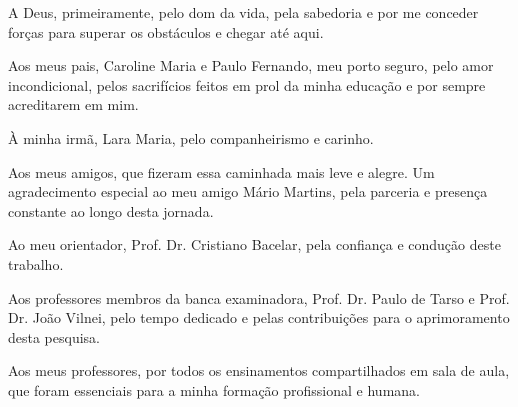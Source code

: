 A Deus, primeiramente, pelo dom da vida, pela sabedoria e por me conceder forças
para superar os obstáculos e chegar até aqui.

Aos meus pais, Caroline Maria e Paulo Fernando, meu porto seguro, pelo amor
incondicional, pelos sacrifícios feitos em prol da minha educação e por sempre
acreditarem em mim. 

À minha irmã, Lara Maria, pelo companheirismo e carinho.

Aos meus amigos, que fizeram essa caminhada mais leve e alegre. Um agradecimento
especial ao meu amigo Mário Martins, pela parceria e presença constante ao longo
desta jornada.

Ao meu orientador, Prof. Dr. Cristiano Bacelar, pela confiança e condução deste
trabalho. 

Aos professores membros da banca examinadora, Prof. Dr. Paulo de Tarso e Prof.
Dr. João Vilnei, pelo tempo dedicado e pelas contribuições para o aprimoramento
desta pesquisa.

Aos meus professores, por todos os ensinamentos compartilhados em sala de aula,
que foram essenciais para a minha formação profissional e humana.  